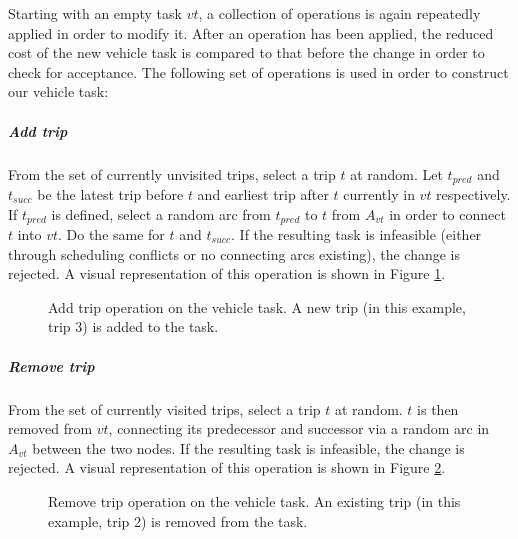 \documentclass[]{article}
\begin{document}
Starting with an empty task $vt$, a collection of operations is again repeatedly applied in order to modify it. After an operation has been applied, the reduced cost of the new vehicle task is compared to that before the change in order to check for acceptance. The following set of operations is used in order to construct our vehicle task: 

\subparagraph{Add trip} From the set of currently unvisited trips, select a trip $t$ at random. Let $t_{pred}$ and $t_{succ}$ be the latest trip before $t$ and earliest trip after $t$ currently in $vt$ respectively. If $t_{pred}$ is defined, select a random arc from $t_{pred}$ to $t$ from $A_{vt}$ in order to connect $t$ into $vt$. Do the same for $t$ and $t_{succ}$. If the resulting task is infeasible (either through scheduling conflicts or no connecting arcs existing), the change is rejected. A visual representation of this operation is shown in Figure \ref{fig:addtrip-vt}.

\begin{figure}[h]
  \centering
  \caption{Add trip operation on the vehicle task. A new trip (in this example, trip 3) is added to the task.}
  \label{fig:addtrip-vt}
\end{figure}

\subparagraph{Remove trip} From the set of currently visited trips, select a trip $t$ at random. $t$ is then removed from $vt$, connecting its predecessor and successor via a random arc in $A_{vt}$ between the two nodes. If the resulting task is infeasible, the change is rejected. A visual representation of this operation is shown in Figure \ref{fig:removetrip-vt}.

\begin{figure}[h]
  \centering
  \caption{Remove trip operation on the vehicle task. An existing trip (in this example, trip 2) is removed from the task.}
  \label{fig:removetrip-vt}
\end{figure}
 
\end{document}
